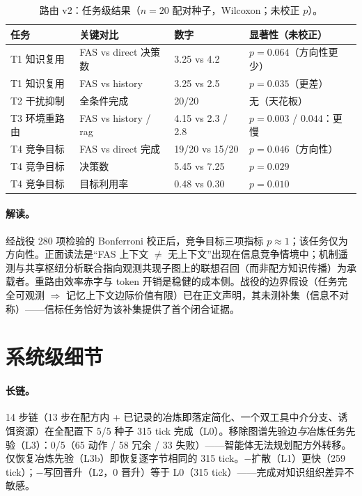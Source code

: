 \documentclass[10pt,a4paper]{ctexart}
\begin{document}
\begin{table}[h]
\centering\small
\caption{路由 v2：任务级结果（$n{=}20$ 配对种子，Wilcoxon；未校正 $p$）。}
\label{tab:s-routing}
\begin{tabular}{L{3.4cm}L{3.0cm}L{3.4cm}L{4.0cm}}
\toprule
\textbf{任务} & \textbf{关键对比} & \textbf{数字} & \textbf{显著性（未校正）} \\
\midrule
T1 知识复用 & FAS vs direct 决策数 & 3.25 vs 4.2 & $p{=}0.064$（方向性更少） \\
T1 知识复用 & FAS vs history & 3.25 vs 2.5 & $p{=}0.035$（更差） \\
T2 干扰抑制 & 全条件完成 & 20/20 & 无（天花板） \\
T3 环境重路由 & FAS vs history / rag & 4.15 vs 2.3 / 2.8 & $p{=}0.003$ / $0.044$：更慢 \\
T4 竞争目标 & FAS vs direct 完成 & 19/20 vs 15/20 & $p{=}0.046$（方向性） \\
T4 竞争目标 & 决策数 & 5.45 vs 7.25 & $p{=}0.029$ \\
T4 竞争目标 & 目标利用率 & 0.48 vs 0.30 & $p{=}0.010$ \\
\bottomrule
\end{tabular}
\end{table}

\paragraph{解读。}经战役 280 项检验的 Bonferroni 校正后，竞争目标三项指标 $p{\approx}1$；该任务仅为方向性。正面读法是“FAS 上下文 $\neq$ 无上下文”出现在信息竞争情境中；机制遥测与共享枢纽分析联合指向观测共现子图上的联想召回（而非配方知识传播）为承载者。重路由效率赤字与 token 开销是稳健的成本侧。战役的边界假设（任务完全可观测 $\Rightarrow$ 记忆上下文边际价值有限）已在正文声明，其未测补集（信息不对称）——信标任务恰好为该补集提供了首个闭合证据。

\section{系统级细节}
\label{s12:system}

\paragraph{长链。}14 步链（13 步在配方内 + 已记录的冶炼即落定简化、一个双工具中介分支、诱饵资源）在全配置下 5/5 种子 315 tick 完成（L0）。移除图谱先验边\emph{与}冶炼任务先验（L3）：0/5（65 动作 / 58 冗余 / 33 失败）——智能体无法规划配方外转移。仅恢复冶炼先验（L3b）即恢复逐字节相同的 315 tick。$-$扩散（L1）更快（259 tick）；$-$写回晋升（L2，0 晋升）等于 L0（315 tick）——完成对知识组织差异不敏感。
\end{document}
